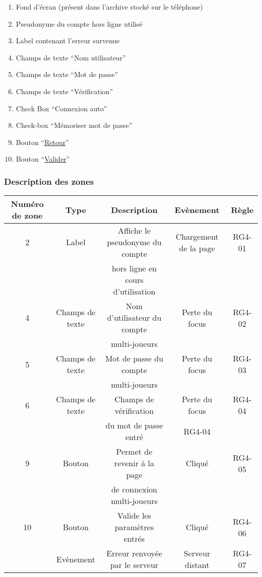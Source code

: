 \documentclass{report}
\begin{document}
		\hypertarget{Creation compte multi-joueurs}{}
		\label{Creation compte multi-joueurs}
	
		\begin{center}
			
		\end{center}
		
		\begin{enumerate}
		  \item Fond d'écran (présent dans l'archive stocké sur le téléphone)
		  \item Pseudonyme du compte hors ligne utilisé
		  \item Label contenant l’erreur survenue
		  \item Champs de texte ``Nom utilisateur''
		  \item Champs de texte ``Mot de passe''
		  \item Champs de texte ``Vérification''
		  \item Check Box ``Connexion auto''
		  \item Check-box ``Mémoriser mot de passe''
		  \item Bouton ``\hyperlink{Connexion multi-joueurs}{Retour}''
		  \item Bouton ``\hyperlink{Accueil multi-joueurs}{Valider}''
		\end{enumerate}
		
		\subsubsection{Description des zones}
		
			\begin{tabular}{|c|c|c|c|c|} \hline
				Numéro de zone & Type  & Description & Evènement &	Règle \\\hline
				2 & Label & Affiche le pseudonyme du compte & Chargement de la page & RG4-01 \\
				  &       & hors ligne en cours d'utilisation & & \\\hline
				4 & Champs de texte & Nom d'utilisateur du compte &  Perte du focus & RG4-02 \\
				  &                 & multi-joueurs               & & \\\hline
				5 & Champs de texte & Mot de passe du compte & Perte du focus & RG4-03 \\
				  &                 & multi-joueurs          & & \\\hline
				6 & Champs de texte & Champs de vérification & Perte du focus & RG4-04 \\
				  & & du mot de passe entré & RG4-04 & \\\hline 
				9 & Bouton & Permet de revenir à la page & Cliqué & RG4-05 \\
				  &        & de connexion multi-joueurs \footnotemark[1] & & \\\hline
				10 & Bouton & Valide les paramètres entrés & Cliqué & RG4-06 \\\hline
				   & Evènement & Erreur renvoyée par le serveur & Serveur distant & RG4-07 \\\hline
			\end{tabular}
			
\end{document}
